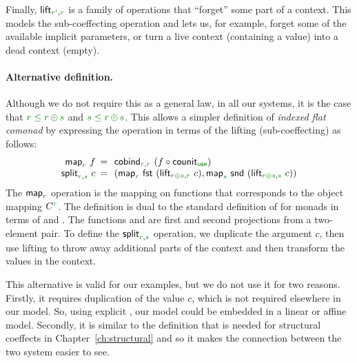 Finally, $\ident{lift}_{\cclrd{r'}, \cclrd{r}}$ is a family of operations that ``forget'' some part of
a context. This models the sub-coeffecting operation and lets us, for example, forget some of the
available implicit parameters, or turn a live context (containing a value) into a dead context (empty).

\paragraph{Alternative definition.}
Although we do not require this as a general law, in all our systems, it is the case that
$\cclrd{r} \;\cleq\; \cclrd{r}\,\cpar\,\cclrd{s}$ and $\cclrd{s} \;\cleq\; \cclrd{r}\,\cpar\,\cclrd{s}$.
This allows a simpler definition of \emph{indexed flat comonad} by expressing the  operation
in terms of the lifting (sub-coeffecting) as follows:
%
\begin{equation*}
\begin{array}{rcl}
\ident{map}_{\cclrd{r}}~f &\narrow{=}& \ident{cobind}_{\cclrd{r}, \cclrd{r}}~(f\circ\ident{counit}_{\cunit}) \\
\ident{split}_{\cclrd{r}, \cclrd{s}}~c &\narrow{=}&
  ( \ident{map}_{\cclrd{r}}~\ident{fst}~(\ident{lift}_{\cclrd{r}\cpar\cclrd{s}, \cclrd{r}}~c), 
    \ident{map}_{\cclrd{s}}~\ident{snd}~(\ident{lift}_{\cclrd{r}\cpar\cclrd{s}, \cclrd{s}}~c) )
\end{array}
\end{equation*}
%
The $\ident{map}_{\cclrd{r}}$ operation is the mapping on functions that corresponds to the object 
mapping $\ctyp{\cclrd{r}}{}$. The definition is dual to the standard definition of  
for monads in terms of  and . The functions  and 
are first and second projections from a two-element pair. To define the 
$\ident{split}_{\cclrd{r}, \cclrd{s}}$ operation, we duplicate the argument $c$, then use 
lifting to throw away additional parts of the context and then transform the values in the 
context.

This alternative is valid for our examples, but we do not use it for two reasons. Firstly, it 
requires duplication of the value $c$, which is not required elsewhere in our model. So, using 
explicit , our model could be embedded in a linear or affine model. Secondly, it
is similar to the definition that is needed for structural coeffects in Chapter~\ref{ch:structural}
and so it makes the connection between the two system easier to see.

